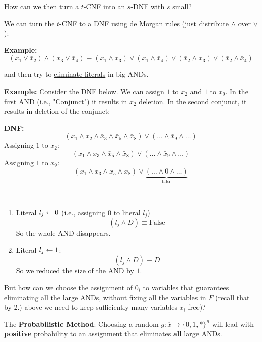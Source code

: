 \bigskip

How can we then turn a $t$-CNF into an $s$-DNF with $s$ small?

We can turn the $t$-CNF to a DNF using de Morgan rules (just distribute $\wedge$ over $\vee$):

\textbf{Example:} 
\[
(x_1 \vee \bar{x}_2) \wedge (x_3 \vee \bar{x}_4) \equiv (x_1 \wedge x_3) \vee (x_1 \wedge \bar{x}_4) \vee (\bar{x}_2 \wedge x_3) \vee (\bar{x}_2 \wedge \bar{x}_4)
\]

and then try to \underline{eliminate literals} in big ANDs.

\textbf{Example:} Consider the DNF below. We can assign $1$ to $x_2$ and $1$ to $x_9$. In the first AND (i.e., "Conjunct") it results in $x_2$ deletion. In the second conjunct, it results in deletion of the conjunct:

\textbf{DNF:} 
\[
(x_1 \wedge x_2 \wedge \bar{x}_3 \wedge \bar{x}_5 \wedge \bar{x}_8) \vee ( \dots \wedge \bar{x}_9 \wedge \dots )
\]
Assigning $1$ to $x_2$:
\[
(x_1 \wedge x_3 \wedge \bar{x}_5 \wedge \bar{x}_8) \vee ( \dots \wedge \bar{x}_9 \wedge \dots )
\]
Assigning $1$ to $x_9$:
\[
(x_1 \wedge x_3 \wedge \bar{x}_5 \wedge \bar{x}_8) \vee \underbrace{( \dots\wedge 0 \wedge \dots)}_{\text{false}} 
\]





\begin{note}\
\begin{enumerate}
    \item Literal $l_j \leftarrow 0$ (i.e., assigning $0$ to literal $l_j$)
    \[
        (l_j \wedge D) \equiv \text{False}
    \]
    So the whole AND disappears.
    
    \item Literal $l_j \leftarrow 1$:
    \[
        (l_j \wedge D) \equiv D
    \]
    So we reduced the size of the AND by $1$.
\end{enumerate}
\end{note}

\noindent{}  But how can we choose the assignment of $0_i$ to variables that guarantees eliminating all the large ANDs, without fixing all the variables in $F$ (recall that by 2.) above we need to keep sufficiently many variables $x_i$ free)?

\bigskip

\noindent{} The \textbf{Probabilistic Method}: Choosing a random $g: \overline x \to \{0,1, *\}^n$ will lead with \textbf{positive} probability to an assignment that eliminates \textbf{all} large ANDs.

